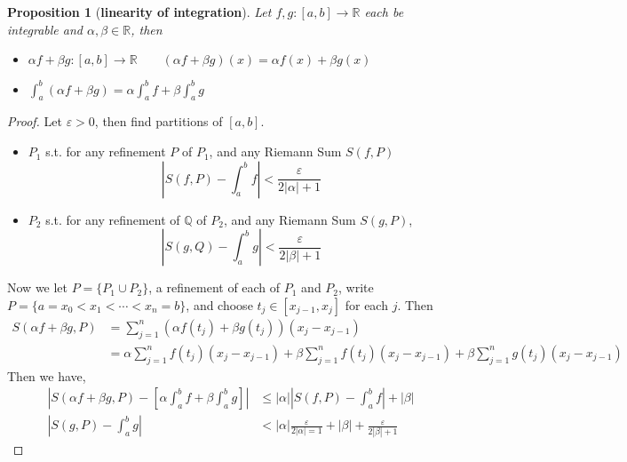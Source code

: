 \documentclass[12pt]{article}
\theoremstyle{plain}
\newtheorem{proposition}{Proposition}[subsection]
\newcommand{\abs}[1]{\left| #1 \right|}
\newcommand{\mQ}{{\mathbb{Q}}}
\newcommand{\mR}{{\mathbb{R}}}
\newcommand{\ep}{\varepsilon}
\begin{document}
	\begin{proposition}[\textbf{linearity of integration}]
		Let $f,g:[a,b] \to \mR$ each be integrable and $\alpha, \beta \in \mR$,
		then 
		\begin{itemize}
			\item $\alpha f + \beta g : [a,b] \to \mR \qquad
				(\alpha f + \beta g)(x) = \alpha f(x) + \beta g(x)$
			\item $\int_a^b (\alpha f + \beta g) = \alpha \int_a^b f + \beta 
				\int_a^b g$
		\end{itemize}
	\end{proposition}
	\begin{proof}
		Let $\ep>0$, then find partitions of $[a,b]$. 
		\begin{itemize}
		\item $P_1$ s.t. for any refinement $P$ of $P_1$, and any Riemann Sum
			$S(f,P)$
			\[
				\abs{S(f,P) - \int_a^b f} < \frac{\ep}{2\abs{\alpha} + 1}
			\]
		\item $P_2$ s.t. for any refinement of $\mQ$ of $P_2$, 
			and any Riemann Sum $S(g,P)$, 
			\[
				\abs{S(g,Q) - \int_a^b g} < \frac{\ep}{2\abs{\beta}+1}
			\]
		\end{itemize}
		Now we let $P = \{P_1\cup P_2\}$, a refinement of each of $P_1$ and 
		$P_2$, write $P=\{a=x_0<x_1<\cdots<x_n = b\}$, and choose
		$t_j \in [x_{j-1}, x_j]$ for each $j$. Then 
		\begin{align*}
			S(\alpha f +\beta g, P) 
			&= \sum_{j=1}^n (\alpha f(t_j)+\beta g(t_j)) (x_j-x_{j-1}) \\
			&=\alpha\sum_{j=1}^n f(t_j)(x_j-x_{j-1}) + 
			\beta \sum_{j=1}^n f(t_j) (x_j-x_{j-1}) +\beta\sum_{j=1}^n 
			g(t_j)(x_j-x_{j-1})
		\end{align*}
		Then we have, 
		\begin{align*}
			\abs{S(\alpha f+\beta g, P)-[\alpha\int_a^b f+\beta\int_a^b g]}
			&\leq \abs{\alpha} \abs{S(f,P) - \int_a^b f} + \abs{\beta} \\
			\abs{S(g,P) - \int_a^b g}
			&< \abs{\alpha} \frac{\ep}{2\abs{\alpha}=1} + \abs{\beta}+\frac{\ep}
			{2\abs{\beta}+1}
		\end{align*}
	\end{proof}
\end{document}
